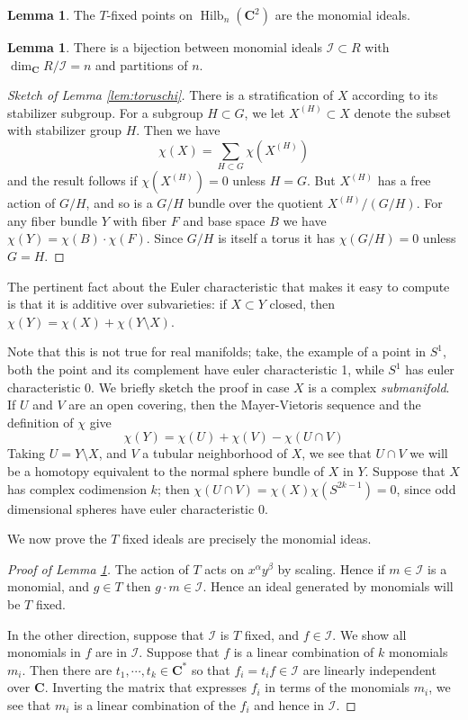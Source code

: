 \documentclass{amsart}[12pt]
\theoremstyle{definition}
\newtheorem{lemma}[dummy]{Lemma}
\newcommand{\C}{\mathbf{C}}
\DeclareMathOperator{\Hilb}{Hilb}
\begin{document}
\begin{lemma} \label{lem:Tmonomials}
The $T$-fixed points on $\Hilb_n(\C^2)$ are the monomial ideals.
\end{lemma}

\begin{lemma} \label{lem:monomialspartitions}
There is a bijection between monomial ideals $\mathcal{I}\subset R$ with $\dim_\C R/\mathcal{I}=n$ and partitions of $n$.
\end{lemma}

\begin{proof}[Sketch of Lemma \ref{lem:toruschi}]
There is a stratification of $X$ according to its stabilizer subgroup.  For a subgroup $H\subset G$, we let $X^{(H)}\subset X$ denote the subset with stabilizer group $H$.  Then we have
$$\chi(X)=\sum_{H\subset G} \chi\left(X^{(H)}\right)$$
and the result follows if $\chi(X^{(H)})=0$ unless $H=G$.  But $X^{(H)}$ has a free action of $G/H$, and so is a $G/H$ bundle over the quotient $X^{(H)}/(G/H)$.  For any fiber bundle $Y$ with fiber $F$ and base space $B$ we have $\chi(Y)=\chi(B)\cdot \chi(F)$.  Since $G/H$ is itself a torus it has $\chi(G/H)=0$ unless $G=H$.  

\end{proof}




The pertinent fact about the Euler characteristic that makes it easy to compute is that it is additive over subvarieties: if $X\subset Y$ closed, then $\chi(Y)=\chi(X)+\chi(Y\setminus X)$.

Note that this is not true for real manifolds; take, the example of a point in $S^1$, both the point and its complement have euler characteristic 1, while $S^1$ has euler characteristic 0.  We briefly sketch the proof in case $X$ is a complex \emph{submanifold}.  If $U$ and $V$ are an open covering, then the Mayer-Vietoris sequence and the definition of $\chi$ give
$$\chi(Y)=\chi(U)+\chi(V)-\chi(U\cap V)$$
Taking $U=Y\setminus X$, and $V$ a tubular neighborhood of $X$, we see that $U\cap V$ we will be a homotopy equivalent to the normal sphere bundle of $X$ in $Y$.  Suppose that $X$ has complex codimension $k$; then $\chi(U\cap V)=\chi(X)\chi(S^{2k-1})=0$, since odd dimensional spheres have euler characteristic 0.

We now prove the $T$ fixed ideals are precisely the monomial ideas.
\begin{proof}[Proof of Lemma \ref{lem:Tmonomials}]
The action of $T$ acts on $x^\alpha y^\beta$ by scaling.  Hence if $m\in \mathcal{I}$ is a monomial, and $g\in T$ then $g\cdot m\in \mathcal{I}$.  Hence an ideal generated by monomials will be $T$ fixed.  

In the other direction, suppose that $\mathcal{I}$ is $T$ fixed, and $f\in\mathcal{I}$.  We show all monomials in $f$ are in $\mathcal{I}$.  Suppose that $f$ is a linear combination of $k$ monomials $m_i$. Then there are $t_1,\cdots, t_k\in\C^*$ so that $f_i=t_i f\in \mathcal{I}$ are linearly independent over $\C$. Inverting the matrix that expresses $f_i$ in terms of the monomials $m_i$, we see that $m_i$ is a linear combination of the $f_i$ and hence in $\mathcal{I}$.
\end{proof}
\end{document}
